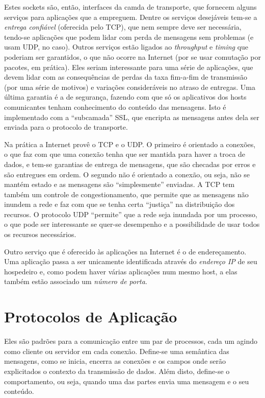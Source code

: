 Estes sockets são, então, interfaces da camda de transporte, que fornecem alguns serviços para aplicações que a empreguem.
Dentre os serviços desejáveis tem-se a \emph{entrega confiável} (oferecida pelo TCP), que nem sempre deve ser necessária, 
tendo-se aplicações que podem lidar com perda de mensagens sem problemas (e usam UDP, no caso).
Outros serviços estão ligados ao \emph{throughput} e \emph{timing} que poderiam ser garantidos, o que não ocorre na Internet (por se usar comutação por pacotes, em prática).
Eles seriam interessante para uma série de aplicações, que devem lidar com as consequências de perdas da taxa fim-a-fim de transmissão (por uma série de motivos) e variações consideráveis no atraso de entregas.
Uma última garantia é a de segurança, fazendo com que só os aplicativos dos hosts comunicantes tenham conhecimento do conteúdo das mensagens.
Isto é implementado com a ``subcamada'' SSL, que encripta as mensagens antes dela ser enviada para o protocolo de transporte.

Na prática a Internet provê o TCP e o UDP. 
O primeiro é orientado a conexões, o que faz com que uma conexão tenha que ser mantida para haver a troca de dados, 
e tem-se garantias de entrega de mensagens, que são checadas por erros e são entregues em ordem.
O segundo não é orientado a conexão, ou seja, não se mantém estado e as mensagens são ``simplesmente'' enviadas.
A TCP tem também um controle de congestionamento, que permite que as mensagens não inundem a rede e faz com que se tenha certa ``justiça'' na distribuição dos recursos. 
O protocolo UDP ``permite'' que a rede seja inundada por um processo, o que pode ser interessante se quer-se desempenho e a possibilidade de usar todos os recursos necessários.

Outro serviço que é oferecido às aplicações na Internet é o de endereçamento.
Uma aplicação passa a ser unicamente identificada através do \emph{endereço IP} de seu hospedeiro e, como podem haver várias aplicações num mesmo host, a elas também estão associado um \emph{número de porta}.

\section{Protocolos de Aplicação}

Eles são padrões para a comunicação entre um par de processos, cada um agindo como cliente ou servidor em cada conexão.
Define-se uma semântica das mensagens, como se inicia, encerra as conexões e os campos onde serão explicitados o contexto da transmissão de dados.
Além disto, define-se o comportamento, ou seja, quando uma das partes envia uma mensagem e o seu conteúdo.

